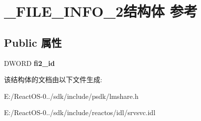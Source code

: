 \hypertarget{struct___f_i_l_e___i_n_f_o__2}{}\section{\+\_\+\+F\+I\+L\+E\+\_\+\+I\+N\+F\+O\+\_\+2结构体 参考}
\label{struct___f_i_l_e___i_n_f_o__2}
\subsection*{Public 属性}
\begin{DoxyCompactItemize}
\item 
\mbox{\label{struct___f_i_l_e___i_n_f_o__2_a4f3f03b31ce9251e59df2f9be001131f}} 
D\+W\+O\+RD {\bfseries fi2\+\_\+id}
\end{DoxyCompactItemize}


该结构体的文档由以下文件生成\+:\begin{DoxyCompactItemize}
\item 
E\+:/\+React\+O\+S-\/0../sdk/include/psdk/lmshare.\+h\item 
E\+:/\+React\+O\+S-\/0../sdk/include/reactos/idl/srvsvc.\+idl\end{DoxyCompactItemize}
